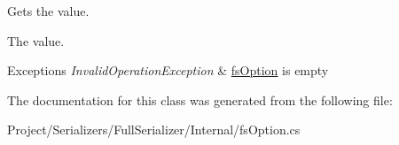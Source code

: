 Gets the value. 

The value.


\begin{DoxyExceptions}{Exceptions}
{\em Invalid\+Operation\+Exception} & \hyperlink{struct_full_serializer_1_1_internal_1_1fs_option}{fs\+Option} is empty\\
\hline
\end{DoxyExceptions}


The documentation for this class was generated from the following file\+:\begin{DoxyCompactItemize}
\item 
Project/\+Serializers/\+Full\+Serializer/\+Internal/fs\+Option.\+cs\end{DoxyCompactItemize}
